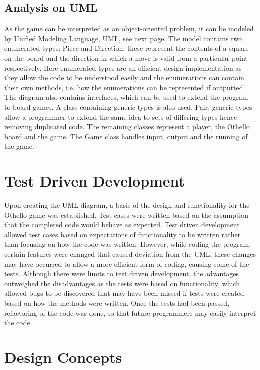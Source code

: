 \documentclass[a4wide, 11pt]{article}
\begin{document}
\subsection{Analysis on UML}
As the game can be interpreted as an object-oriented problem, it can be modeled by Unified Modeling Language, UML, see next page. The model contains two enumerated types: Piece and Direction; these represent the contents of a square on the board and the direction in which a move is valid from a particular point respectively.  Here enumerated types are an efficient design implementation as they allow the code to be understood easily and the enumerations can contain their own methods, i.e. how the enumerations can be represented if outputted. The diagram also contains interfaces, which can be used to extend the program to board games. A class containing generic types is also used, Pair, generic types allow a programmer to extend the same idea to sets of differing types hence removing duplicated code. The remaining classes represent a player, the Othello board and the game. The Game class handles input, output and the running of the game.

\section{Test Driven Development}
Upon creating the UML diagram, a basis of the design and functionality for the Othello game was established. Test cases were written based on the assumption that the completed code would behave as expected. Test driven development allowed test cases based on expectations of functionality to be written rather than focusing on how the code was written. However, while coding the program, certain features were changed that caused deviation from the UML, these changes may have occurred to allow a more efficient form of coding, causing some of the tests. Although there were limits to test driven development, the advantages outweighed the disadvantages as the tests were based on functionality, which allowed bugs to be discovered that may have been missed if tests were created based on how the methods were written. Once the tests had been passed, refactoring of the code was done, so that future programmers may easily interpret the code.

\section{Design Concepts}
\end{document}
